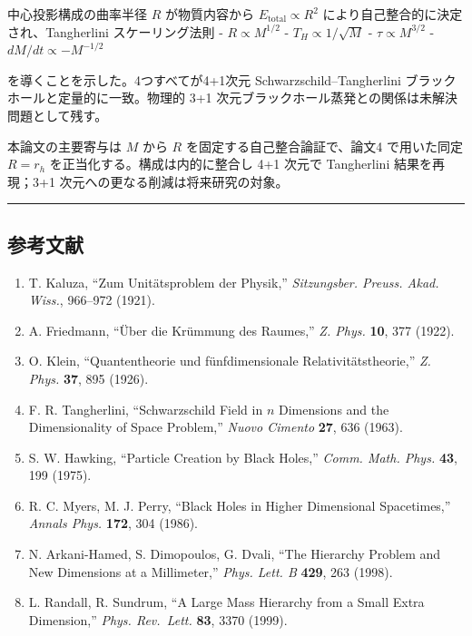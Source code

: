 \documentclass[a4paper,11pt]{ltjsarticle}
\theoremstyle{definition}
\providecommand{\tightlist}{\setlength{\itemsep}{0pt}\setlength{\parskip}{0pt}}
\begin{document}
中心投影構成の曲率半径 \(R\) が物質内容から
\(E_{\mathrm{total}} \propto R^2\)
により自己整合的に決定され、Tangherlini スケーリング法則 -
\(R \propto M^{1/2}\) - \(T_H \propto 1/\sqrt{M}\) -
\(\tau \propto M^{3/2}\) - \(dM/dt \propto -M^{-1/2}\)

を導くことを示した。4つすべてが4+1次元 Schwarzschild--Tangherlini
ブラックホールと定量的に一致。物理的 3+1
次元ブラックホール蒸発との関係は未解決問題として残す。

本論文の主要寄与は \(M\) から \(R\) を固定する自己整合論証で、論文4
で用いた同定 \(R = r_h\) を正当化する。構成は内的に整合し 4+1 次元で
Tangherlini 結果を再現；3+1 次元への更なる削減は将来研究の対象。

\begin{center}\rule{0.5\linewidth}{0.5pt}\end{center}

\subsection{参考文献}\label{ux53c2ux8003ux6587ux732e}

\begin{enumerate}
\def\labelenumi{\arabic{enumi}.}
\tightlist
\item
  T. Kaluza, ``Zum Unitätsproblem der Physik,'' \emph{Sitzungsber.
  Preuss. Akad. Wiss.}, 966--972 (1921).
\item
  A. Friedmann, ``Über die Krümmung des Raumes,'' \emph{Z. Phys.}
  \textbf{10}, 377 (1922).
\item
  O. Klein, ``Quantentheorie und fünfdimensionale Relativitätstheorie,''
  \emph{Z. Phys.} \textbf{37}, 895 (1926).
\item
  F. R. Tangherlini, ``Schwarzschild Field in \(n\) Dimensions and the
  Dimensionality of Space Problem,'' \emph{Nuovo Cimento} \textbf{27},
  636 (1963).
\item
  S. W. Hawking, ``Particle Creation by Black Holes,'' \emph{Comm. Math.
  Phys.} \textbf{43}, 199 (1975).
\item
  R. C. Myers, M. J. Perry, ``Black Holes in Higher Dimensional
  Spacetimes,'' \emph{Annals Phys.} \textbf{172}, 304 (1986).
\item
  N. Arkani-Hamed, S. Dimopoulos, G. Dvali, ``The Hierarchy Problem and
  New Dimensions at a Millimeter,'' \emph{Phys. Lett. B} \textbf{429},
  263 (1998).
\item
  L. Randall, R. Sundrum, ``A Large Mass Hierarchy from a Small Extra
  Dimension,'' \emph{Phys. Rev.~Lett.} \textbf{83}, 3370 (1999).
\end{enumerate}
\end{document}
